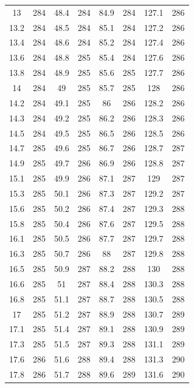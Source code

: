 \documentclass[12pt]{ctexart}
\numberwithin{equation}{section}
\begin{document}
\begin{longtable}{cc|cc|cc|cc}
13  &  284  &  48.4  &  284  &  84.9  &  284  &  127.1  &  286  \\
13.2  &  284  &  48.5  &  284  &  85.1  &  284  &  127.2  &  286  \\
13.4  &  284  &  48.6  &  284  &  85.2  &  284  &  127.4  &  286  \\
13.6  &  284  &  48.8  &  285  &  85.4  &  284  &  127.6  &  286  \\
13.8  &  284  &  48.9  &  285  &  85.6  &  285  &  127.7  &  286  \\
14  &  284  &  49  &  285  &  85.7  &  285  &  128  &  286  \\
14.2  &  284  &  49.1  &  285  &  86  &  286  &  128.2  &  286  \\
14.3  &  284  &  49.2  &  285  &  86.2  &  286  &  128.3  &  286  \\
14.5  &  284  &  49.5  &  285  &  86.5  &  286  &  128.5  &  286  \\
14.7  &  285  &  49.6  &  285  &  86.7  &  286  &  128.7  &  287  \\
14.9  &  285  &  49.7  &  286  &  86.9  &  286  &  128.8  &  287  \\
15.1  &  285  &  49.9  &  286  &  87.1  &  287  &  129  &  287  \\
15.3  &  285  &  50.1  &  286  &  87.3  &  287  &  129.2  &  287  \\
15.6  &  285  &  50.2  &  286  &  87.4  &  287  &  129.3  &  288  \\
15.8  &  285  &  50.4  &  286  &  87.6  &  287  &  129.5  &  288  \\
16.1  &  285  &  50.5  &  286  &  87.7  &  287  &  129.7  &  288  \\
16.3  &  285  &  50.7  &  286  &  88  &  287  &  129.8  &  288  \\
16.5  &  285  &  50.9  &  287  &  88.2  &  288  &  130  &  288  \\
16.6  &  285  &  51  &  287  &  88.4  &  288  &  130.3  &  288  \\
16.8  &  285  &  51.1  &  287  &  88.7  &  288  &  130.5  &  288  \\
17  &  285  &  51.2  &  287  &  88.9  &  288  &  130.7  &  289  \\
17.1  &  285  &  51.4  &  287  &  89.1  &  288  &  130.9  &  289  \\
17.3  &  285  &  51.5  &  287  &  89.3  &  288  &  131.1  &  289  \\
17.6  &  286  &  51.6  &  288  &  89.4  &  288  &  131.3  &  290  \\
17.8  &  286  &  51.7  &  288  &  89.6  &  289  &  131.6  &  290  \\

\end{longtable}
\end{document}

